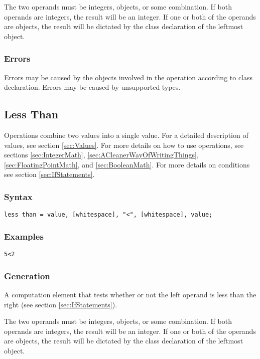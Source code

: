 \documentclass[10pt,a4paper]{article}
\begin{document}
The two operands must be integers, objects, or some combination. If both operands are integers, the result will be an integer. If one or both of the operands are objects, the result will be dictated by the class declaration of the leftmost object.

\subsubsection{Errors}
Errors may be caused by the objects involved in the operation according to class declaration. Errors may be caused by unsupported types.

\newpage




\subsection{Less Than}
Operations combine two values into a single value. For a detailed description of values, see section \ref{sec:Values}. For more details on how to use operations, see sections \ref{sec:IntegerMath}, \ref{sec:ACleanerWayOfWritingThings}, \ref{sec:FloatingPointMath}, and \ref{sec:BooleanMath}. For more details on conditions see section \ref{sec:IfStatements}.

\subsubsection{Syntax}
\begin{verbatim}
less than = value, [whitespace], "<", [whitespace], value;
\end{verbatim}

\subsubsection{Examples}
\begin{verbatim}
5<2
\end{verbatim}

\subsubsection{Generation}
A computation element that tests whether or not the left operand is less than the right (see section \ref{sec:IfStatements}).

The two operands must be integers, objects, or some combination. If both operands are integers, the result will be an integer. If one or both of the operands are objects, the result will be dictated by the class declaration of the leftmost object.
\end{document}
